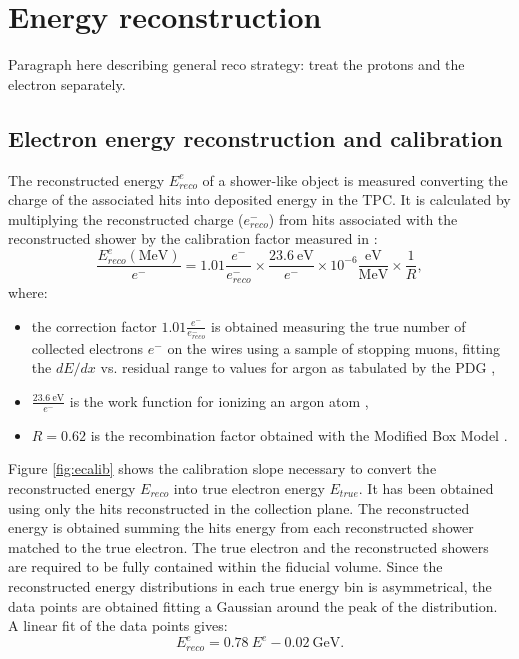 
\section{Energy reconstruction}\label{sec:energyreco}

Paragraph here describing general reco strategy: treat the protons and the electron separately.  

\subsection{Electron energy reconstruction and calibration}\label{sec:showerenergy}
The reconstructed energy $E_{reco}^{e}$ of a shower-like object is measured converting the charge of the associated hits into deposited energy in the TPC. It is calculated by multiplying the reconstructed charge ($e^{-}_{reco}$) from hits associated with the reconstructed shower by the calibration factor measured in \cite{michel}:
\begin{equation}
\frac{E_{reco}^{e} \mathrm{(MeV)}}{e^-} = 1.01\frac{e^-}{e^{-}_{reco}} \times \frac{23.6~\mathrm{eV}}{e^-} \times 10^{-6} \frac{\mathrm{eV}}{\mathrm{MeV}} \times \frac{1}{R},\label{eq:calib}
\end{equation}
where:
\begin{itemize}

\item the correction factor $1.01\frac{e^-}{e^{-}_{reco}}$ is obtained measuring the true number of collected electrons $e^{-}$ on the wires using a sample of stopping muons, fitting the $dE/dx$ vs. residual range to values for argon as tabulated by the PDG \cite{pdg},
\item $\frac{23.6~\mathrm{eV}}{e^-}$ is the work function for ionizing an argon atom \cite{workfunction},
\item $R = 0.62$ is the recombination factor obtained with the Modified Box Model \cite{boxmodel}.
\end{itemize}
Figure \ref{fig:ecalib} shows the calibration slope necessary to convert the reconstructed energy $E_{reco}$ into true electron energy $E_{true}$. It has been obtained using only the hits reconstructed in the collection plane. 
The reconstructed energy is obtained summing the hits energy from each reconstructed shower matched to the true electron. The true electron and the reconstructed showers are required to be fully contained within the fiducial volume. Since the reconstructed energy distributions in each true energy bin is asymmetrical, the data points are obtained fitting a Gaussian around the peak of the distribution.
A linear fit of the data points gives:
\begin{equation}
E_{reco}^{e} = 0.78~E^{e} - 0.02~\mathrm{GeV}.
\end{equation}

